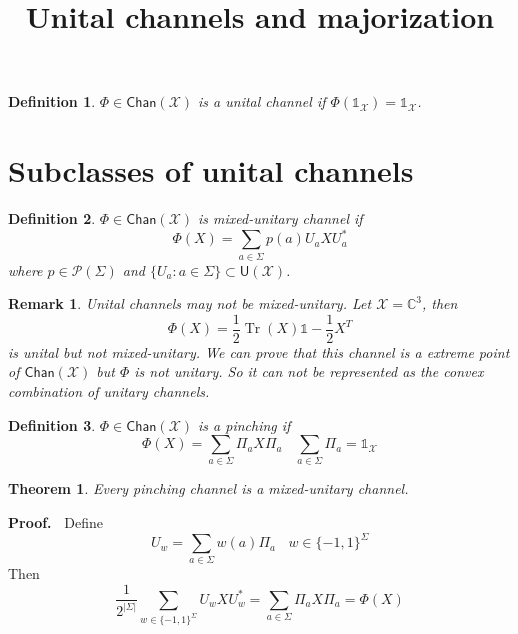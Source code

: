 \documentclass[aps,pra,onecolumn,notitlepage,superscriptaddress]{revtex4-1}
\newcommand{\C}{\mathbb{C}}
\newcommand{\spc}[1]{\mathcal{#1}}
\newcommand{\U}{\mathsf{U}}
\newcommand{\Tr}{\operatorname{Tr}}
\newcommand{\Chan}{{\mathsf{Chan}}}
\newcommand\I{\mathds{1}}
\newtheorem{theo}{Theorem}
\newtheorem{defi}{Definition}
\newtheorem{rem}{Remark}
\def\Proof{{\bf Proof.~}}
\begin{document}
    \title{Unital channels and majorization}
    \author{}
    \maketitle

    \begin{defi}
        $\Phi \in \Chan(\spc X)$ is a unital channel if $\Phi(\I_{\spc X}) = \I_{\spc X}$.
    \end{defi}

    \section{Subclasses of unital channels}
    \begin{defi}
        $\Phi \in \Chan(\spc X)$ is mixed-unitary channel if 
        \begin{equation}
            \Phi(X) = \sum_{a \in \Sigma} p(a) U_a X U_a^*
        \end{equation}
        where $p \in \spc P(\Sigma)$ and $\{ U_a : a \in \Sigma \} \subset \U(\spc X)$.
    \end{defi}

    \begin{rem}
        Unital channels may not be mixed-unitary. Let $\spc X = \C^3$, then
        \begin{equation}
            \Phi(X) = \frac{1}{2} \Tr(X) \I - \frac{1}{2} X^T
        \end{equation}
        is unital but not mixed-unitary. We can prove that this channel is a extreme point of $\Chan(\spc X)$ but $\Phi$ is not unitary. So it can not be represented as the convex combination of unitary channels.
    \end{rem}
    
    \begin{defi}
        $\Phi \in \Chan(\spc X)$ is a pinching if
        \begin{equation}
            \Phi(X) = \sum_{a \in \Sigma} \Pi_a X \Pi_a \ \ \ \ \sum_{a \in \Sigma} \Pi_a = \I_{\spc X}
        \end{equation}
    \end{defi}

    \begin{theo}
        Every pinching channel is a mixed-unitary channel.
    \end{theo}
    \Proof
    Define
    \begin{equation}
        U_{w} = \sum_{a \in \Sigma} w(a) \Pi_a \ \ \ \ w \in \{-1,1\}^\Sigma
    \end{equation}
    Then
    \begin{equation}
        \frac{1}{2^{|\Sigma|}} \sum_{w \in \{-1,1\}^\Sigma} U_w X U_w^* = \sum_{a \in \Sigma} \Pi_a X \Pi_a = \Phi(X)
    \end{equation}
\end{document}
